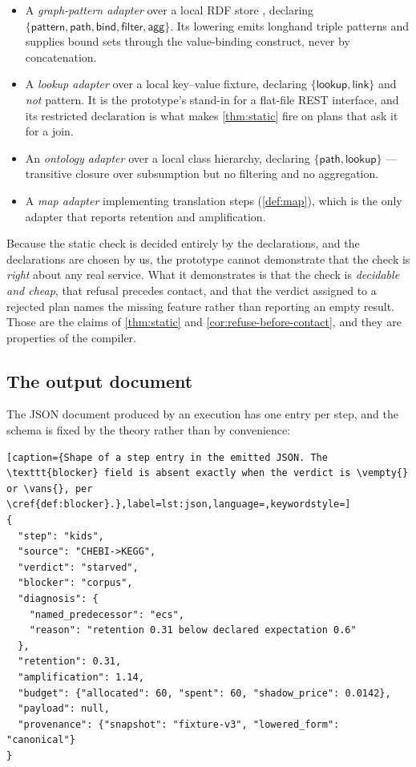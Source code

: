 \begin{itemize}[leftmargin=2.4em]
\item A \emph{graph-pattern adapter} over a local RDF store
\citep{RDFLib,Pyoxigraph}, declaring
$\{\textsf{pattern}, \textsf{path}, \textsf{bind}, \textsf{filter}, \textsf{agg}\}$.
Its lowering emits longhand triple patterns and supplies bound sets through the
value-binding construct, never by concatenation.
\item A \emph{lookup adapter} over a local key--value fixture, declaring
$\{\textsf{lookup}, \textsf{link}\}$ and \emph{not} \textsf{pattern}. It is the
prototype's stand-in for a flat-file REST interface, and its restricted
declaration is what makes \cref{thm:static} fire on plans that ask it for a
join.
\item An \emph{ontology adapter} over a local class hierarchy, declaring
$\{\textsf{path}, \textsf{lookup}\}$ --- transitive closure over subsumption but
no filtering and no aggregation.
\item A \emph{map adapter} implementing translation steps
(\cref{def:map}), which is the only adapter that reports retention and
amplification.
\end{itemize}

\begin{remark}
\label{rem:decl-experiment}
Because the static check is decided entirely by the declarations, and the
declarations are chosen by us, the prototype cannot demonstrate that the check
is \emph{right} about any real service. What it demonstrates is that the check
is \emph{decidable and cheap}, that refusal precedes contact, and that the
verdict assigned to a rejected plan names the missing feature rather than
reporting an empty result. Those are the claims of \cref{thm:static} and
\cref{cor:refuse-before-contact}, and they are properties of the compiler.
\end{remark}

\subsection{The output document}

The JSON document produced by an execution has one entry per step, and the
schema is fixed by the theory rather than by convenience:

\begin{lstlisting}[caption={Shape of a step entry in the emitted JSON. The \texttt{blocker} field is absent exactly when the verdict is \vempty{} or \vans{}, per \cref{def:blocker}.},label=lst:json,language=,keywordstyle=]
{
  "step": "kids",
  "source": "CHEBI->KEGG",
  "verdict": "starved",
  "blocker": "corpus",
  "diagnosis": {
    "named_predecessor": "ecs",
    "reason": "retention 0.31 below declared expectation 0.6"
  },
  "retention": 0.31,
  "amplification": 1.14,
  "budget": {"allocated": 60, "spent": 60, "shadow_price": 0.0142},
  "payload": null,
  "provenance": {"snapshot": "fixture-v3", "lowered_form": "canonical"}
}
\end{lstlisting}

